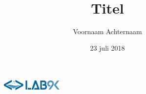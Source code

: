 \documentclass[11pt, letterpaper, oneside]{article}
\title{Titel}
\author{Voornaam Achternaam}
\date{23 juli 2018}
\begin{document}
	\begin{figure}
		\includegraphics[width=0.27\textwidth,keepaspectratio]{figuren/logo} %
	\end{figure}
	\vspace*{0.35cm}
	
	\noindent
	\fontsize{30pt}{28pt}\selectfont\textcolor{priColour}{\textbf{\@title}}\newline
	
	\fontsize{11pt}{15pt}\selectfont
	
	\lipsum[1]
\end{document}
